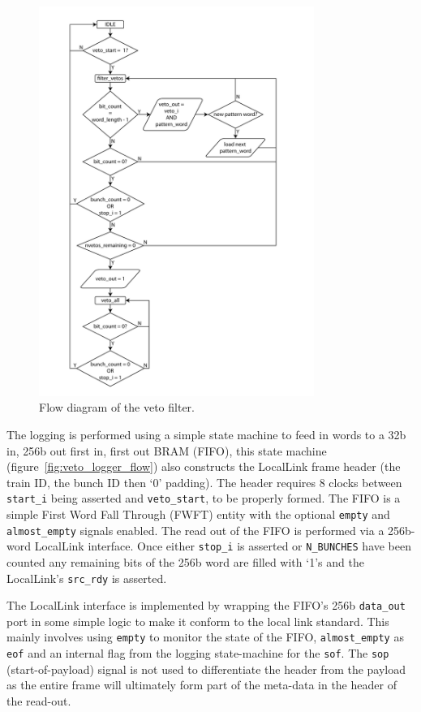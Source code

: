 \begin{figure}[htbp]
  \centering
  \includegraphics[width=0.8\textwidth]{images/pdfs/veto_filter_flow.pdf}
  \caption{Flow diagram of the veto filter.}
  \label{fig:veto_filter_flow}
\end{figure}
    
The logging is performed using a simple state machine to feed in words to a 32b in, 256b out first in, first out BRAM (FIFO), this state machine (figure~\ref{fig:veto_logger_flow}) also constructs the LocalLink frame header (the train ID, the bunch ID then `0' padding). The header requires 8 clocks between \texttt{start\_i} being asserted and \texttt{veto\_start}, to be properly formed. The FIFO is a simple First Word Fall Through (FWFT) entity with the optional \texttt{empty} and \texttt{almost\_empty} signals enabled. The read out of the FIFO is performed via a 256b-word LocalLink interface. Once either \texttt{stop\_i} is asserted or \texttt{N\_BUNCHES} have been counted any remaining bits of the 256b word are filled with `1's and the LocalLink's \texttt{src\_rdy} is asserted. 
    
The LocalLink interface is implemented by wrapping the FIFO's 256b \texttt{data\_out} port in some simple logic to make it conform to the local link standard. This mainly involves using \texttt{empty} to monitor the state of the FIFO, \texttt{almost\_empty} as \texttt{eof} and an internal flag from the logging state-machine for the \texttt{sof}. The \texttt{sop} (start-of-payload) signal is not used to differentiate the header from the payload as the entire frame will ultimately form part of the meta-data in the header of the read-out.
    
